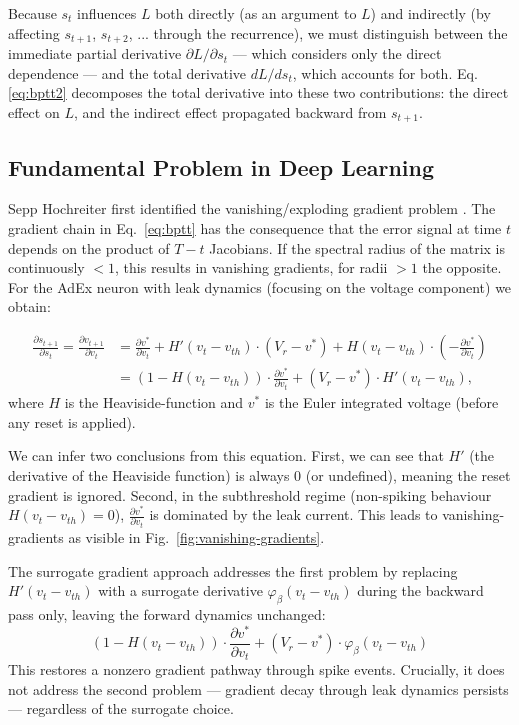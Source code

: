 Because $s_t$ influences $L$ both directly (as an argument to $L$) and indirectly (by affecting $s_{t+1}$, $s_{t+2}$, ... through the recurrence),
we must distinguish between the immediate partial derivative $\partial L/\partial s_t$ — which considers only the direct dependence — and the total derivative $dL/ds_t$, which accounts for both.
Eq. \ref{eq:bptt2} decomposes the total derivative into these two contributions:
the direct effect on $L$, and the indirect effect propagated backward from $s_{t+1}$.

\subsection{Fundamental Problem in Deep Learning}\label{sec:bg:sg:vanishing-gradients}
Sepp Hochreiter first identified the vanishing/exploding gradient problem \cite{Hochreiter1991}.
The gradient chain in Eq.~\ref{eq:bptt} has the consequence that the error signal at time $t$ depends on the product of $T-t$ Jacobians.
If the spectral radius of the matrix is continuously $<1$, this results in vanishing gradients, for radii $>1$ the opposite.
For the AdEx neuron with leak dynamics (focusing on the voltage component) we obtain:

\begin{align*}
  \frac{\partial s_{t+1}}{\partial s_{t}} = \frac{\partial v_{t+1}}{\partial v_{t}} &= \frac{\partial v^*}{\partial v_t} + H'(v_t - v_{th}) \cdot (V_r - v^*) + H(v_t - v_{th}) \cdot \left(-\frac{\partial
  v^*}{\partial v_t}\right)\\
  &= (1 - H(v_t - v_{th})) \cdot \frac{\partial v^*}{\partial v_t} + (V_r - v^*) \cdot H'(v_t - v_{th}),
\end{align*}
where $H$ is the Heaviside-function and $v^*$ is the Euler integrated voltage (before any reset is applied).

We can infer two conclusions from this equation.
First, we can see that $H'$ (the derivative of the Heaviside function) is always 0 (or undefined), meaning the reset gradient is ignored.
Second, in the subthreshold regime (non-spiking behaviour $H(v_t - v_{th}) = 0$), $\frac{\partial v^*}{\partial v_t}$ is dominated by the leak current.
This leads to vanishing-gradients as visible in Fig.~\ref{fig:vanishing-gradients}.

The surrogate gradient approach addresses the first problem by replacing $H'(v_t - v_{th})$ with a surrogate derivative $\varphi_\beta(v_t - v_{th})$ during the backward pass only, leaving the forward dynamics unchanged:
\begin{equation*}
  (1 - H(v_t - v_{th})) \cdot \frac{\partial v^*}{\partial v_t} + (V_r - v^*) \cdot \varphi_\beta(v_t - v_{th})
\end{equation*}
This restores a nonzero gradient pathway through spike events.
Crucially, it does not address the second problem — gradient decay through leak dynamics persists --- regardless of the surrogate choice.

